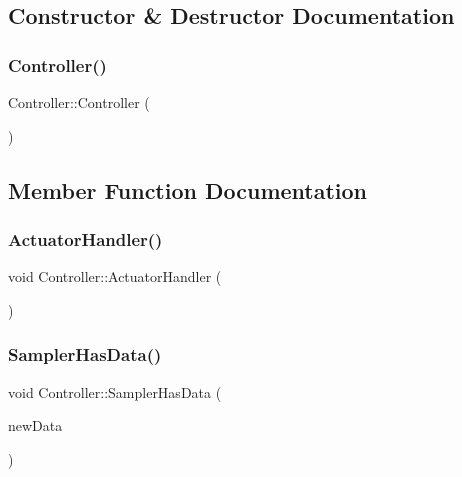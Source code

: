 \subsection{Constructor \& Destructor Documentation}
\mbox{\label{classController_a95c56822d667e94b031451729ce069a9}} 
\subsubsection{\texorpdfstring{Controller()}{Controller()}}
{\footnotesize\ttfamily Controller\+::\+Controller (\begin{DoxyParamCaption}{ }\end{DoxyParamCaption})\hspace{0.3cm}{\ttfamily [inline]}}



\subsection{Member Function Documentation}
\mbox{\label{classController_acd0145853d19eaf3ef9d15f6203ace69}} 
\subsubsection{\texorpdfstring{Actuator\+Handler()}{ActuatorHandler()}}
{\footnotesize\ttfamily void Controller\+::\+Actuator\+Handler (\begin{DoxyParamCaption}{ }\end{DoxyParamCaption})\hspace{0.3cm}{\ttfamily [private]}}

\mbox{\label{classController_a4b765eaaf8f72e964118967f86c265e2}} 
\subsubsection{\texorpdfstring{Sampler\+Has\+Data()}{SamplerHasData()}}
{\footnotesize\ttfamily void Controller\+::\+Sampler\+Has\+Data (\begin{DoxyParamCaption}\item[{\hyperlink{structEnvironmentData}{Environment\+Data}}]{new\+Data }\end{DoxyParamCaption})}

